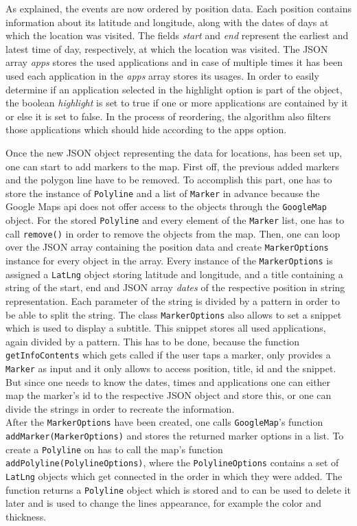 As  explained, the events are now ordered by position data. Each position contains information about its latitude and longitude, along with the dates of days at which the location was visited. The fields \emph{start} and \emph{end} represent the earliest and latest time of day, respectively, at which the location was visited. The JSON array \emph{apps} stores the used applications and in case of multiple times it has been used each application in the \emph{apps} array stores its usages. In order to easily determine if an application selected in the highlight option is part of the object, the boolean \emph{highlight} is set to true if one or more applications are contained by it or else it is set to false. In the process of reordering, the algorithm also filters those applications which should hide according to the apps option.

Once  the new JSON object representing the data for locations, has been set up, one can start to add markers to the map. First off, the previous added markers and the polygon line have to be removed. To accomplish this part, one has to store the instance of \lstinline$Polyline$ and a list of \lstinline$Marker$ in advance because the Google Maps api does not offer access to the objects through the \lstinline$GoogleMap$ object. For the stored \lstinline$Polyline$ and every element of the \lstinline$Marker$ list, one has to call \lstinline$remove()$ in order to remove the objects from the map. Then, one can loop over the JSON array containing the position data and create \lstinline$MarkerOptions$ instance for every object in the array. Every instance of the \lstinline$MarkerOptions$ is assigned a \lstinline$LatLng$ object storing latitude and longitude, and a title containing a string of the start, end and JSON array \emph{dates} of the respective position in string representation. Each parameter of the string is divided by a pattern in order to be able to split the string. The class \lstinline$MarkerOptions$ also allows to set a snippet which is used to display a subtitle. This snippet stores all used applications,  again divided by a pattern. This has to be done, because the function \lstinline$getInfoContents$ which gets called if the user taps a marker, only provides a \lstinline$Marker$ as input and it only allows to access position, title, id and the snippet. But since one needs to know the dates, times and applications one can either map the marker's id to the respective JSON object and store this, or one can divide the strings in order to recreate the information.\\
After the \lstinline{MarkerOptions} have been created, one calls \lstinline$GoogleMap$'s function \lstinline$addMarker(MarkerOptions)$ and stores the returned marker options in a list.
To create a \lstinline$Polyline$ on has to call the map's function \lstinline$addPolyline(PolylineOptions)$, where the \lstinline$PolylineOptions$ contains a set of \lstinline$LatLng$ objects which get connected in the order in which they were added. The function returns a \lstinline$Polyline$ object which is stored and to can be used to delete it later and is used to change the lines appearance, for example the color and thickness.


